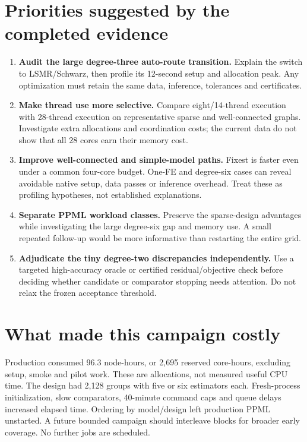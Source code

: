 \documentclass[11pt]{article}
\begin{document}
\clearpage\section{Priorities suggested by the completed evidence}

\begin{enumerate}\item \textbf{Audit the large degree-three auto-route transition.} Explain the switch to LSMR/Schwarz, then profile its 12-second setup and allocation peak. Any optimization must retain the same data, inference, tolerances and certificates.

\item \textbf{Make thread use more selective.} Compare eight/14-thread execution with 28-thread execution on representative sparse and well-connected graphs. Investigate extra allocations and coordination costs; the current data do not show that all 28 cores earn their memory cost.

\item \textbf{Improve well-connected and simple-model paths.} Fixest is faster even under a common four-core budget. One-FE and degree-six cases can reveal avoidable native setup, data passes or inference overhead. Treat these as profiling hypotheses, not established explanations.

\item \textbf{Separate PPML workload classes.} Preserve the sparse-design advantages while investigating the large degree-six gap and memory use. A small repeated follow-up would be more informative than restarting the entire grid.

\item \textbf{Adjudicate the tiny degree-two discrepancies independently.} Use a targeted high-accuracy oracle or certified residual/objective check before deciding whether candidate or comparator stopping needs attention. Do not relax the frozen acceptance threshold.\end{enumerate}

\section{What made this campaign costly}

Production consumed 96.3 node-hours, or 2,695 reserved core-hours, excluding setup, smoke and pilot work. These are allocations, not measured useful CPU time. The design had 2,128 groups with five or six estimators each. Fresh-process initialization, slow comparators, 40-minute command caps and queue delays increased elapsed time. Ordering by model/design left production PPML unstarted. A future bounded campaign should interleave blocks for broader early coverage. No further jobs are scheduled.
\end{document}
